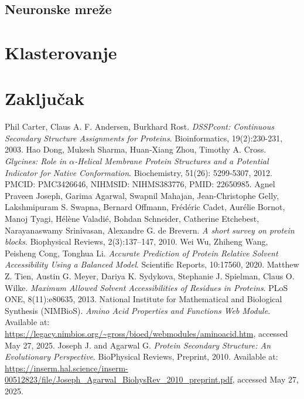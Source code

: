 \documentclass[a4paper,12pt]{article}
\begin{document}
\subsection{Neuronske mreže}

\newpage
\section{Klasterovanje}
\newpage
\section{Zaključak}
\newpage
\begin{thebibliography}{5}
    Phil Carter, Claus A. F. Andersen, Burkhard Rost. 
    \textit{DSSPcont: Continuous Secondary Structure Assignments for Proteins}. 
    Bioinformatics, 19(2):230-231, 2003.
    Hao Dong, Mukesh Sharma, Huan-Xiang Zhou, Timothy A. Cross.  
    \textit{Glycines: Role in $\alpha$-Helical Membrane Protein Structures and a Potential Indicator for Native Conformation}.  
    Biochemistry, 51(26): 5299-5307, 2012.  
    PMCID: PMC3426646, NIHMSID: NIHMS383776, PMID: 22650985.
    Agnel Praveen Joseph, Garima Agarwal, Swapnil Mahajan, 
    Jean-Christophe Gelly, Lakshmipuram S. Swapna, Bernard Offmann, 
    Frédéric Cadet, Aurélie Bornot, Manoj Tyagi, Hélène Valadié, Bohdan Schneider, 
    Catherine Etchebest, Narayanaswamy Srinivasan, Alexandre G. de Brevern.  
    \textit{A short survey on protein blocks}.  
    Biophysical Reviews, 2(3):137–147, 2010.
	Wei Wu, Zhiheng Wang, Peisheng Cong, Tonghua Li.  
	\textit{Accurate Prediction of Protein Relative Solvent Accessibility Using a Balanced Model}.  
	Scientific Reports, 10:17560, 2020.
	Matthew Z. Tien, Austin G. Meyer, Dariya K. Sydykova, Stephanie J. Spielman, Claus O. Wilke.  
	\textit{Maximum Allowed Solvent Accessibilities of Residues in Proteins}.  
	PLoS ONE, 8(11):e80635, 2013.
    National Institute for Mathematical and Biological Synthesis (NIMBioS). 
    \textit{Amino Acid Properties and Functions Web Module}. 
    Available at: \url{https://legacy.nimbios.org/~gross/bioed/webmodules/aminoacid.htm}, accessed May 27, 2025.
    Joseph J. and Agarwal G. 
    \textit{Protein Secondary Structure: An Evolutionary Perspective}. 
    BioPhysical Reviews, Preprint, 2010. 
    Available at: \url{https://inserm.hal.science/inserm-00512823/file/Joseph_Agarwal_BiohysRev_2010_preprint.pdf}, accessed May 27, 2025.

\end{thebibliography}
\end{document}
